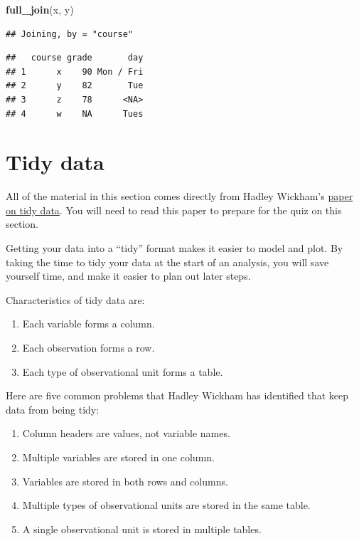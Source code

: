 \documentclass[]{book}
\makeatletter
\newenvironment{Shaded}{\begin{snugshade}}{\end{snugshade}}
\newcommand{\KeywordTok}[1]{\textcolor[rgb]{0.13,0.29,0.53}{\textbf{{#1}}}}
\newcommand{\NormalTok}[1]{{#1}}
\providecommand{\tightlist}{%
  \setlength{\itemsep}{0pt}\setlength{\parskip}{0pt}}
\newenvironment{kframe}{%
\medskip{}
\setlength{\fboxsep}{.8em}
 \def\at@end@of@kframe{}%
 \ifinner\ifhmode%
  \def\at@end@of@kframe{\end{minipage}}%
  \begin{minipage}{\columnwidth}%
 \fi\fi%
 \def\FrameCommand##1{\hskip\@totalleftmargin \hskip-\fboxsep
 \colorbox{shadecolor}{##1}\hskip-\fboxsep
     \hskip-\linewidth \hskip-\@totalleftmargin \hskip\columnwidth}%
 \MakeFramed {\advance\hsize-\width
   \@totalleftmargin\z@ \linewidth\hsize
   \@setminipage}}%
 {\par\unskip\endMakeFramed%
 \at@end@of@kframe}
\renewenvironment{Shaded}{\begin{kframe}}{\end{kframe}}
\makeatother
\begin{document}
\begin{Shaded}
\begin{Highlighting}[]
\KeywordTok{full_join}\NormalTok{(x, y)}
\end{Highlighting}
\end{Shaded}

\begin{verbatim}
## Joining, by = "course"
\end{verbatim}

\begin{verbatim}
##   course grade       day
## 1      x    90 Mon / Fri
## 2      y    82       Tue
## 3      z    78      <NA>
## 4      w    NA      Tues
\end{verbatim}

\section{Tidy data}\label{tidy-data}

All of the material in this section comes directly from Hadley Wickham's
\href{http://vita.had.co.nz/papers/tidy-data.pdf}{paper on tidy data}.
You will need to read this paper to prepare for the quiz on this
section.

Getting your data into a ``tidy'' format makes it easier to model and
plot. By taking the time to tidy your data at the start of an analysis,
you will save yourself time, and make it easier to plan out later steps.

Characteristics of tidy data are:

\begin{enumerate}
\def\labelenumi{\arabic{enumi}.}
\tightlist
\item
  Each variable forms a column.
\item
  Each observation forms a row.
\item
  Each type of observational unit forms a table.
\end{enumerate}

Here are five common problems that Hadley Wickham has identified that
keep data from being tidy:

\begin{enumerate}
\def\labelenumi{\arabic{enumi}.}
\tightlist
\item
  Column headers are values, not variable names.
\item
  Multiple variables are stored in one column.
\item
  Variables are stored in both rows and columns.
\item
  Multiple types of observational units are stored in the same table.
\item
  A single observational unit is stored in multiple tables.
\end{enumerate}
\end{document}
